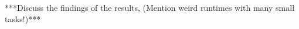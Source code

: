 \section{}

***Discuss the findings of the results, (Mention weird runtimes with many small tasks!)***